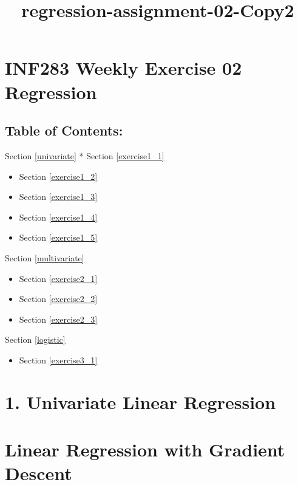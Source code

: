 \documentclass[11pt]{article}
\title{regression-assignment-02-Copy2}
\providecommand{\tightlist}{%
      \setlength{\itemsep}{0pt}\setlength{\parskip}{0pt}}
\begin{document}
    
    
    \maketitle
    
    

    
    \section{INF283 \textbar{} Weekly Exercise 02 \textbar{}
Regression}\label{inf283-weekly-exercise-02-regression}

    \subsection{Table of Contents:}\label{table-of-contents}

Section \ref{univariate} * Section \ref{exercise1_1}

\begin{itemize}
\item
  Section \ref{exercise1_2}
\item
  Section \ref{exercise1_3}
\item
  Section \ref{exercise1_4}
\item
  Section \ref{exercise1_5}
\end{itemize}

Section \ref{multivariate}

\begin{itemize}
\item
  Section \ref{exercise2_1}
\item
  Section \ref{exercise2_2}
\item
  Section \ref{exercise2_3}
\end{itemize}

Section \ref{logistic}

\begin{itemize}
\tightlist
\item
  Section \ref{exercise3_1}
\end{itemize}

    \section{1. Univariate Linear Regression
}\label{univariate-linear-regression}

    \section{Linear Regression with Gradient
Descent}\label{linear-regression-with-gradient-descent}
\end{document}
